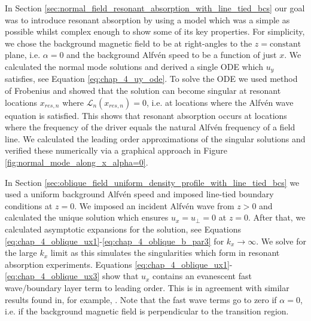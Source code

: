 In Section \ref{sec:normal_field_resonant_absorption_with_line_tied_bcs} our goal was to introduce resonant absorption by using a model which was a simple as possible whilst complex enough to show some of its key properties. For simplicity, we chose the background magnetic field to be at right-angles to the $z=\text{constant}$ plane, i.e. $\alpha=0$ and the background Alfv\'en speed to be a function of just $x$. We calculated the normal mode solutions and derived a single ODE which $u_y$ satisfies, see Equation \eqref{eq:chap_4_uy_ode}. To solve the ODE we used method of Frobenius and showed that the solution can become singular at resonant locations $x_{res,n}$ where $\mathcal{L}_n(x_{res,n})=0$, i.e. at locations where the Alfv\'en wave equation is satisfied. This shows that resonant absorption occurs at locations where the frequency of the driver equals the natural Alfv\'en frequency of a field line. We calculated the leading order approximations of the singular solutions and verified these numerically via a graphical approach in Figure \ref{fig:normal_mode_along_x_alpha=0}.

In Section \ref{sec:oblique_field_uniform_density_profile_with_line_tied_bcs} we used a uniform background Alfv\'en speed and imposed line-tied boundary conditions at $z=0$. We imposed an incident Alfv\'en wave from $z>0$ and calculated the unique solution which ensures $u_x=u_\perp=0$ at $z=0$. After that, we calculated asymptotic expansions for the solution, see Equations \eqref{eq:chap_4_oblique_ux1}-\eqref{eq:chap_4_oblique_b_par3} for $k_x\rightarrow\infty$. We solve for the large $k_x$ limit as this simulates the singularities which form in resonant absorption experiments. Equations \eqref{eq:chap_4_oblique_ux1}-\eqref{eq:chap_4_oblique_ux3} show that $u_x$ contains an evanescent fast wave/boundary layer term to leading order. This is in agreement with similar results found in, for example, \citet{Halberstadt1993,Halberstadt1995,Arregui2003}. Note that the fast wave terms go to zero if $\alpha=0$, i.e. if the background magnetic field is perpendicular to the transition region.

